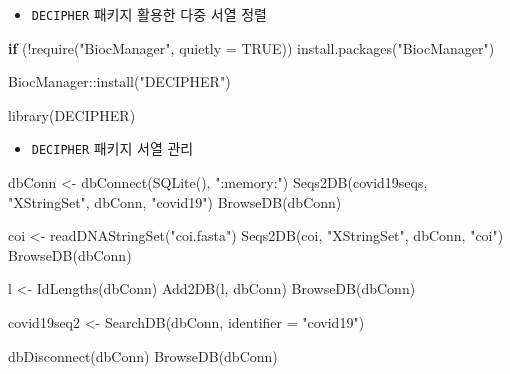 \documentclass[
]{book}
\newenvironment{Shaded}{\begin{snugshade}}{\end{snugshade}}
\newcommand{\AttributeTok}[1]{\textcolor[rgb]{0.77,0.63,0.00}{#1}}
\newcommand{\ConstantTok}[1]{\textcolor[rgb]{0.00,0.00,0.00}{#1}}
\newcommand{\ControlFlowTok}[1]{\textcolor[rgb]{0.13,0.29,0.53}{\textbf{#1}}}
\newcommand{\FunctionTok}[1]{\textcolor[rgb]{0.00,0.00,0.00}{#1}}
\newcommand{\NormalTok}[1]{#1}
\newcommand{\OtherTok}[1]{\textcolor[rgb]{0.56,0.35,0.01}{#1}}
\newcommand{\SpecialCharTok}[1]{\textcolor[rgb]{0.00,0.00,0.00}{#1}}
\newcommand{\StringTok}[1]{\textcolor[rgb]{0.31,0.60,0.02}{#1}}
\providecommand{\tightlist}{%
  \setlength{\itemsep}{0pt}\setlength{\parskip}{0pt}}
\begin{document}
\begin{itemize}
\tightlist
\item
  \texttt{DECIPHER} 패키지 활용한 다중 서열 정렬
\end{itemize}

\begin{Shaded}
\begin{Highlighting}[]

\ControlFlowTok{if}\NormalTok{ (}\SpecialCharTok{!}\FunctionTok{require}\NormalTok{(}\StringTok{"BiocManager"}\NormalTok{, }\AttributeTok{quietly =} \ConstantTok{TRUE}\NormalTok{))}
    \FunctionTok{install.packages}\NormalTok{(}\StringTok{"BiocManager"}\NormalTok{)}

\NormalTok{BiocManager}\SpecialCharTok{::}\FunctionTok{install}\NormalTok{(}\StringTok{"DECIPHER"}\NormalTok{)}

\FunctionTok{library}\NormalTok{(DECIPHER)}
\end{Highlighting}
\end{Shaded}

\begin{itemize}
\tightlist
\item
  \texttt{DECIPHER} 패키지 서열 관리
\end{itemize}

\begin{Shaded}
\begin{Highlighting}[]

\NormalTok{dbConn }\OtherTok{\textless{}{-}} \FunctionTok{dbConnect}\NormalTok{(}\FunctionTok{SQLite}\NormalTok{(), }\StringTok{":memory:"}\NormalTok{)}
\FunctionTok{Seqs2DB}\NormalTok{(covid19seqs, }\StringTok{"XStringSet"}\NormalTok{, dbConn, }\StringTok{"covid19"}\NormalTok{)}
\FunctionTok{BrowseDB}\NormalTok{(dbConn)}

\NormalTok{coi }\OtherTok{\textless{}{-}} \FunctionTok{readDNAStringSet}\NormalTok{(}\StringTok{"coi.fasta"}\NormalTok{)}
\FunctionTok{Seqs2DB}\NormalTok{(coi, }\StringTok{"XStringSet"}\NormalTok{, dbConn, }\StringTok{"coi"}\NormalTok{)}
\FunctionTok{BrowseDB}\NormalTok{(dbConn)}

\NormalTok{l }\OtherTok{\textless{}{-}} \FunctionTok{IdLengths}\NormalTok{(dbConn)}
\FunctionTok{Add2DB}\NormalTok{(l, dbConn)}
\FunctionTok{BrowseDB}\NormalTok{(dbConn)}

\NormalTok{covid19seq2 }\OtherTok{\textless{}{-}} \FunctionTok{SearchDB}\NormalTok{(dbConn, }\AttributeTok{identifier =} \StringTok{"covid19"}\NormalTok{)}

\FunctionTok{dbDisconnect}\NormalTok{(dbConn)}
\FunctionTok{BrowseDB}\NormalTok{(dbConn)}
\end{Highlighting}
\end{Shaded}
\end{document}
